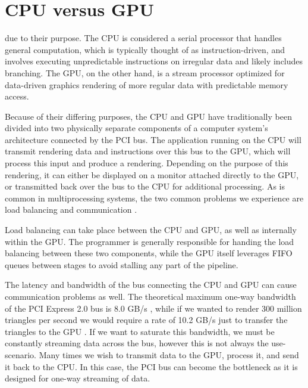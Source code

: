 \section{CPU versus GPU}
\label{sec:cpu_v_gpu}

due to their purpose. The CPU is considered a serial processor that handles general computation, which is typically thought of as instruction-driven, and involves executing unpredictable instructions on irregular data and likely includes branching. The GPU, on the other hand, is a stream processor optimized for data-driven graphics rendering of more regular data with predictable memory access. \cite{bib:rtr}

Because of their differing purposes, the CPU and GPU have traditionally been divided into two physically separate components of a computer system’s architecture connected by the PCI bus. The application running on the CPU will transmit rendering data and instructions over this bus to the GPU, which will process this input and produce a rendering. Depending on the purpose of this rendering, it can either be displayed on a monitor attached directly to the GPU, or transmitted back over the bus to the CPU for additional processing. As is common in multiprocessing systems, the two common problems we experience are load balancing and communication \cite{bib:rtr}. 

Load balancing can take place between the CPU and GPU, as well as internally within the GPU. The programmer is generally responsible for handing the load balancing between these two components, while the GPU itself leverages FIFO queues between stages to avoid stalling any part of the pipeline.

The latency and bandwidth of the bus connecting the CPU and GPU can cause communication problems as well. The theoretical maximum one-way bandwidth of the PCI Express 2.0 bus is 8.0 GB/s \cite{bib:pci_press}, while if we wanted to render 300 million triangles per second we would require a rate of 10.2 GB/s just to transfer the triangles to the GPU \cite{bib:rtr}. If we want to saturate this bandwidth, we must be constantly streaming data across the bus, however this is not always the use-scenario. Many times we wish to transmit data to the GPU, process it, and send it back to the CPU. In this case, the PCI bus can become the bottleneck as it is designed for one-way streaming of data.

